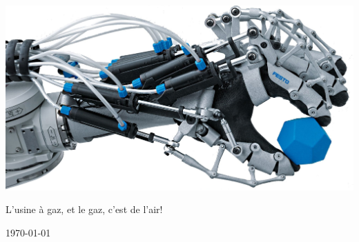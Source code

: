 \documentclass[10pt,a4paper,final]{article}
\begin{document}
\begin{center}
\begin{multicols}{2}
\begin{flushright}
\end{flushright}
\end{multicols}

\bigskip
\bigskip


\includegraphics[scale=0.6]{Figures/Picture_for_Title.jpg} 

\vfill
L'usine à gaz, et le gaz, c'est de l'air!
\bigskip

{\large \today}
\end{center}






\pagebreak
\begin{spacing}{1.14999}
\tableofcontents 
\pagebreak
\listoffigures  
\listoftables 
\end{spacing}  
\pagebreak






\renewcommand\headrulewidth{1pt}
\end{document}
